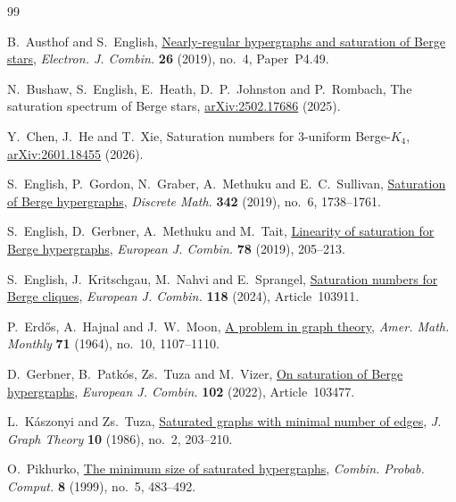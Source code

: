 \documentclass[10pt,a4paper]{article}
\numberwithin{equation}{section}
\theoremstyle{definition}
\theoremstyle{plain}
\begin{document}
\begin{thebibliography}{99}

B.~Austhof and S.~English,
\newblock \href{https://doi.org/10.37236/8363}{Nearly-regular hypergraphs and saturation of Berge stars},
\newblock \emph{Electron. J. Combin.} \textbf{26} (2019), no.~4,
Paper~P4.49.

N.~Bushaw, S.~English, E.~Heath, D.~P.~Johnston and P.~Rombach,
\newblock The saturation spectrum of Berge stars,
\newblock \href{https://arxiv.org/abs/2502.17686}{arXiv:2502.17686} (2025).

Y.~Chen, J.~He and T.~Xie,
\newblock Saturation numbers for $3$-uniform Berge-$K_4$,
\newblock \href{https://arxiv.org/abs/2601.18455}{arXiv:2601.18455} (2026).

S.~English, P.~Gordon, N.~Graber, A.~Methuku and E.~C.~Sullivan,
\newblock \href{https://doi.org/10.1016/j.disc.2019.01.031}{Saturation of Berge hypergraphs},
\newblock \emph{Discrete Math.} \textbf{342} (2019), no.~6, 1738--1761.

S.~English, D.~Gerbner, A.~Methuku and M.~Tait,
\newblock \href{https://doi.org/10.1016/j.ejc.2019.02.002}{Linearity of saturation for Berge hypergraphs},
\newblock \emph{European J. Combin.} \textbf{78} (2019), 205--213.

S.~English, J.~Kritschgau, M.~Nahvi and E.~Sprangel,
\newblock \href{https://doi.org/10.1016/j.ejc.2023.103911}{Saturation numbers for Berge cliques},
\newblock \emph{European J. Combin.} \textbf{118} (2024), Article~103911.

P.~Erd\H{o}s, A.~Hajnal and J.~W.~Moon,
\newblock \href{https://doi.org/10.2307/2311408}{A problem in graph theory},
\newblock \emph{Amer. Math. Monthly} \textbf{71} (1964), no.~10, 1107--1110.

D.~Gerbner, B.~Patk\'os, Zs.~Tuza and M.~Vizer,
\newblock \href{https://doi.org/10.1016/j.ejc.2021.103477}{On saturation of Berge hypergraphs},
\newblock \emph{European J. Combin.} \textbf{102} (2022), Article~103477.

L.~K\'aszonyi and Zs.~Tuza,
\newblock \href{https://doi.org/10.1002/jgt.3190100209}{Saturated graphs with minimal number of edges},
\newblock \emph{J. Graph Theory} \textbf{10} (1986), no.~2, 203--210.

O.~Pikhurko,
\newblock \href{https://doi.org/10.1017/S0963548399003971}{The minimum size of saturated hypergraphs},
\newblock \emph{Combin. Probab. Comput.} \textbf{8} (1999), no.~5, 483--492.

\end{thebibliography}
\end{document}
